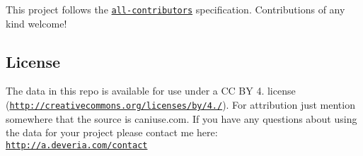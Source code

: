 This project follows the \href{https://github.com/kentcdodds/all-contributors}{\tt all-\/contributors} specification. Contributions of any kind welcome!

\subsection*{License}

The data in this repo is available for use under a CC BY 4. license (\href{http://creativecommons.org/licenses/by/4.0/}{\tt http\+://creativecommons.\+org/licenses/by/4./}). For attribution just mention somewhere that the source is caniuse.\+com. If you have any questions about using the data for your project please contact me here\+: \href{http://a.deveria.com/contact}{\tt http\+://a.\+deveria.\+com/contact} 
